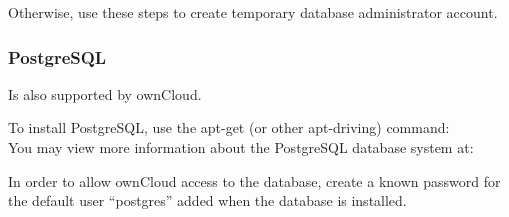 \documentclass[letterpaper,10pt,english]{sphinxmanual}
\begin{document}
Otherwise, use these steps to create temporary database administrator account.
\begin{quote}

\begin{DUlineblock}{0em}
\item[] 
\item[] 
\item[] 
\item[] 
\item[] 
\item[] 
\item[] 
\end{DUlineblock}
\end{quote}


\subsubsection{PostgreSQL}
\label{installation/installation_wizard:postgresql}
Is also supported by ownCloud.
\begin{description}
\item[{To install PostgreSQL, use the apt-get (or other apt-driving) command:}] \leavevmode
{}

\item[{You may view more information about the PostgreSQL database system at:}] \leavevmode
{}

\end{description}

In order to allow ownCloud access to the database, create a known password for the
default user ``postgres'' added when the database is installed.
\begin{quote}

\begin{DUlineblock}{0em}
\item[] 
\item[] 
\item[] 
\item[] 
\item[] 
\item[] 
\item[] 
\item[] 
\end{DUlineblock}
\end{quote}
\end{document}
